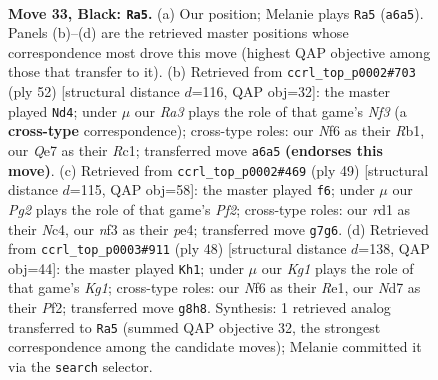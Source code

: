 \documentclass[11pt]{article}
\begin{document}
\clearpage

\begin{figure}[p]\centering
\begin{subfigure}{0.46\textwidth}\centering
\resizebox{\linewidth}{!}{%
\newchessgame
\chessboard[
  setfen={3r2k1/3nq1p1/rp3n2/3p3p/P3p3/2N2NP1/2P2P1P/R2RQK2 b - - 1 33},
  showmover=false,
  pgfstyle=straightmove, color=movearrow, markmove={a6-a5}
]}
\caption{}
\end{subfigure}\hfill
\begin{subfigure}{0.46\textwidth}\centering
\resizebox{\linewidth}{!}{%
\newchessgame
\chessboard[
  setfen={rqr3k1/3n1pp1/1p2p2p/1P1n4/2N5/4PN2/4QPPP/1RR3K1 w - - 1 27},
  showmover=false,
  pgfstyle=straightmove, color=movearrow, markmove={f3-d4}
]}
\caption{}
\end{subfigure}
\\[4pt]
\begin{subfigure}{0.46\textwidth}\centering
\resizebox{\linewidth}{!}{%
\newchessgame
\chessboard[
  setfen={r1r3k1/3q1ppp/1n6/3p4/p1n1P2N/6NP/R4PP1/Q2R2K1 b - - 1 25},
  showmover=false,
  pgfstyle=straightmove, color=movearrow, markmove={f7-f6}
]}
\caption{}
\end{subfigure}\hfill
\begin{subfigure}{0.46\textwidth}\centering
\resizebox{\linewidth}{!}{%
\newchessgame
\chessboard[
  setfen={4r1k1/2p2pp1/2nq3p/p2n4/P2Pr3/4NN1P/3Q1PP1/2R1R1K1 w - - 5 25},
  showmover=false,
  pgfstyle=straightmove, color=movearrow, markmove={g1-h1}
]}
\caption{}
\end{subfigure}
\caption{\textbf{Move 33, Black: \texttt{Ra5}.} (a) Our position; Melanie plays \texttt{Ra5} (\texttt{a6a5}). Panels (b)--(d) are the retrieved master positions whose correspondence most drove this move (highest QAP objective among those that transfer to it). (b) Retrieved from \texttt{ccrl\_top\_p0002\#703} (ply 52) [structural distance $d$=116, QAP obj=32]: the master played \texttt{Nd4}; under $\mu$ our \emph{Ra3} plays the role of that game's \emph{Nf3} (a \textbf{cross-type} correspondence); cross-type roles: our \emph{N}f6 as their \emph{R}b1, our \emph{Q}e7 as their \emph{R}c1; transferred move \texttt{a6a5} \textbf{(endorses this move)}. (c) Retrieved from \texttt{ccrl\_top\_p0002\#469} (ply 49) [structural distance $d$=115, QAP obj=58]: the master played \texttt{f6}; under $\mu$ our \emph{Pg2} plays the role of that game's \emph{Pf2}; cross-type roles: our \emph{r}d1 as their \emph{N}c4, our \emph{n}f3 as their \emph{p}e4; transferred move \texttt{g7g6}. (d) Retrieved from \texttt{ccrl\_top\_p0003\#911} (ply 48) [structural distance $d$=138, QAP obj=44]: the master played \texttt{Kh1}; under $\mu$ our \emph{Kg1} plays the role of that game's \emph{Kg1}; cross-type roles: our \emph{N}f6 as their \emph{R}e1, our \emph{N}d7 as their \emph{P}f2; transferred move \texttt{g8h8}. Synthesis: 1 retrieved analog transferred to \texttt{Ra5} (summed QAP objective 32, the strongest correspondence among the candidate moves); Melanie committed it via the \texttt{search} selector.}
\label{fig:thought-m65}
\end{figure}
\end{document}
